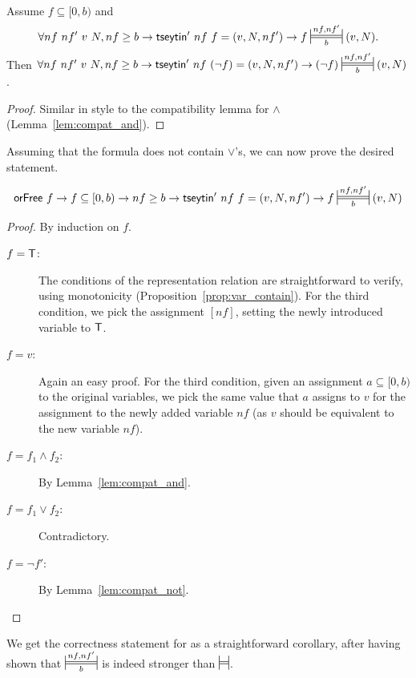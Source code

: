 \begin{lemma}\label{lem:compat_not}~\\
  Assume $f \subseteq [0, b)$ and 
  \[\forall nf~nf'~v~N, nf \ge b \rightarrow \tseytin'~nf~f = (v, N, nf') \rightarrow f \Frepr{nf}{nf'}{b} (v, N).\]
  Then 
  $\forall nf~nf'~v~N, nf \ge b \rightarrow \tseytin'~nf~(\lnot f) = (v, N, nf') \rightarrow (\lnot f) \Frepr{nf}{nf'}{b} (v, N)$. 
\end{lemma}
\begin{proof}
  Similar in style to the compatibility lemma for $\land$ (Lemma~\ref{lem:compat_and}).
\end{proof}

Assuming that the formula does not contain $\lor$'s, we can now prove the desired statement. 
\begin{theorem}
  \[\orFree~f \rightarrow f \subseteq [0, b) \rightarrow nf \ge b \rightarrow \tseytin'~nf~f = (v, N, nf') \rightarrow f \Frepr{nf}{nf'}{b} (v, N)\] 
\end{theorem}
\begin{proof}
  By induction on $f$.
  \begin{description}
    \item[$f = \mathsf{T}$:] The conditions of the representation relation are straightforward to verify, using monotonicity (Proposition~\ref{prop:var_contain}). For the third condition, we pick the assignment $[nf]$, setting the newly introduced variable to $\mathsf{T}$.
    \item[$f = v$:] Again an easy proof. For the third condition, given an assignment $a \subseteq [0, b)$ to the original variables, we pick the same value that $a$ assigns to $v$ for the assignment to the newly added variable $nf$ (as $v$ should be equivalent to the new variable $nf$). 
    \item[$f = f_1 \land f_2$:] By Lemma~\ref{lem:compat_and}.
    \item[$f = f_1 \lor f_2$:] Contradictory.
    \item[$f = \lnot f'$:] By Lemma~\ref{lem:compat_not}.
  \end{description}
\end{proof}

We get the correctness statement for \tseytin{} as a straightforward corollary, after having shown that $\Frepr{nf}{nf'}{b}$ is indeed stronger than $\frepr$.

